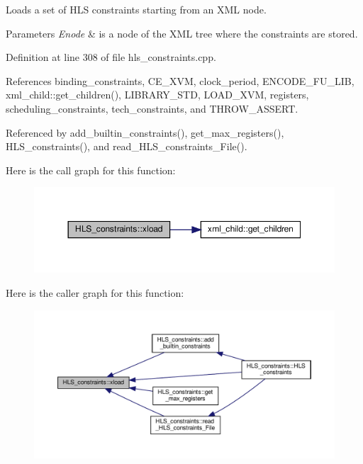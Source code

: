 Loads a set of H\+LS constraints starting from an X\+ML node. 


\begin{DoxyParams}{Parameters}
{\em Enode} & is a node of the X\+ML tree where the constraints are stored. \\
\hline
\end{DoxyParams}


Definition at line 308 of file hls\+\_\+constraints.\+cpp.



References binding\+\_\+constraints, C\+E\+\_\+\+X\+VM, clock\+\_\+period, E\+N\+C\+O\+D\+E\+\_\+\+F\+U\+\_\+\+L\+IB, xml\+\_\+child\+::get\+\_\+children(), L\+I\+B\+R\+A\+R\+Y\+\_\+\+S\+TD, L\+O\+A\+D\+\_\+\+X\+VM, registers, scheduling\+\_\+constraints, tech\+\_\+constraints, and T\+H\+R\+O\+W\+\_\+\+A\+S\+S\+E\+RT.



Referenced by add\+\_\+builtin\+\_\+constraints(), get\+\_\+max\+\_\+registers(), H\+L\+S\+\_\+constraints(), and read\+\_\+\+H\+L\+S\+\_\+constraints\+\_\+\+File().

Here is the call graph for this function\+:
\nopagebreak
\begin{figure}[H]
\begin{center}
\leavevmode
\includegraphics[width=350pt]{dd/d96/classHLS__constraints_ae9f1030321791e339e7ced72f1d00cb1_cgraph}
\end{center}
\end{figure}
Here is the caller graph for this function\+:
\nopagebreak
\begin{figure}[H]
\begin{center}
\leavevmode
\includegraphics[width=350pt]{dd/d96/classHLS__constraints_ae9f1030321791e339e7ced72f1d00cb1_icgraph}
\end{center}
\end{figure}
\mbox{\label{classHLS__constraints_ab4c4cb541597b8ac5e28b4309ea1af4b}} 
